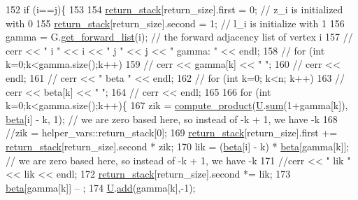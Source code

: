 \begin{DoxyCode}
152     \textcolor{keywordflow}{if} (i==j)\{
153 
154       \hyperlink{namespacehelper__vars_a36577c81e805c58ec2ec7ed63882317f}{return\_stack}[return\_size].first = 0; \textcolor{comment}{// z\_i is initialized with 0}
155       \hyperlink{namespacehelper__vars_a36577c81e805c58ec2ec7ed63882317f}{return\_stack}[return\_size].second = 1; \textcolor{comment}{// l\_i is initialize with 1}
156       gamma = G.\hyperlink{classgraph_aa8fbee52a7b3604dbbd9175040c7ead5}{get\_forward\_list}(i); \textcolor{comment}{// the forward adjacency list of vertex i}
157       \textcolor{comment}{// cerr << " i " << i << " j " << j << " gamma: " << endl;}
158       \textcolor{comment}{// for (int k=0;k<gamma.size();k++)}
159       \textcolor{comment}{//   cerr << gamma[k] << " ";}
160       \textcolor{comment}{// cerr << endl;}
161       \textcolor{comment}{// cerr << " beta " << endl;}
162       \textcolor{comment}{// for (int k=0; k<n; k++)}
163       \textcolor{comment}{//   cerr << beta[k] << " ";}
164       \textcolor{comment}{// cerr << endl;}
165 
166       \textcolor{keywordflow}{for} (\textcolor{keywordtype}{int} k=0;k<gamma.size();k++)\{
167         zik = \hyperlink{compression__helper_8cpp_ae2afb43aabe50f7d42aae8f82b5a35f4}{compute\_product}(\hyperlink{classgraph__encoder_a3314c40920f2ee132958a6b0ce7e7995}{U}.\hyperlink{classreverse__fenwick__tree_a672731fd6395b4853430073a099a80e6}{sum}(1+gamma[k]), \hyperlink{classgraph__encoder_a40880adecfd63fb86e94b4b0fc3f6bc2}{beta}[i] - k, 1); \textcolor{comment}{// we are zero
       based here, so instead of -k + 1, we have -k}
168         \textcolor{comment}{//zik = helper\_vars::return\_stack[0];}
169         \hyperlink{namespacehelper__vars_a36577c81e805c58ec2ec7ed63882317f}{return\_stack}[return\_size].first += \hyperlink{namespacehelper__vars_a36577c81e805c58ec2ec7ed63882317f}{return\_stack}[return\_size].second * zik;
170         lik = (\hyperlink{classgraph__encoder_a40880adecfd63fb86e94b4b0fc3f6bc2}{beta}[i] - k) * \hyperlink{classgraph__encoder_a40880adecfd63fb86e94b4b0fc3f6bc2}{beta}[gamma[k]]; \textcolor{comment}{// we are zero based here, so instead of -k + 1, we
       have -k}
171         \textcolor{comment}{//cerr << " lik " << lik << endl;}
172         \hyperlink{namespacehelper__vars_a36577c81e805c58ec2ec7ed63882317f}{return\_stack}[return\_size].second *= lik;
173         \hyperlink{classgraph__encoder_a40880adecfd63fb86e94b4b0fc3f6bc2}{beta}[gamma[k]] -- ;
174         \hyperlink{classgraph__encoder_a3314c40920f2ee132958a6b0ce7e7995}{U}.\hyperlink{classreverse__fenwick__tree_a942d7f49b37e53ebfec3076d177691d7}{add}(gamma[k],-1);

\end{DoxyCode}
